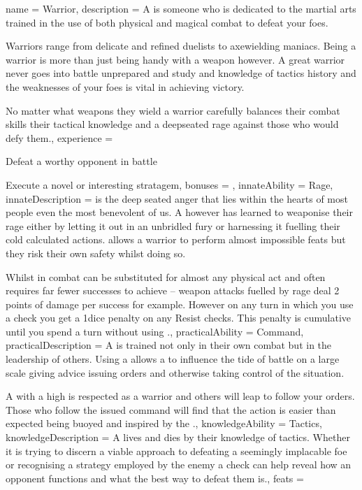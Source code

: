 \archetype
{
	name = Warrior,
	description = A \bname{} is someone who is dedicated to the martial arts\comma{} trained in the use of both physical and magical combat to defeat your foes. 

Warriors range from delicate and refined duelists\comma{} to axe\minus{}wielding maniacs. Being a warrior is more than just being handy with a weapon\comma{} however. A great warrior never goes into battle unprepared\comma{} and study and knowledge of tactics\comma{} history and the weaknesses of your foes is vital in achieving victory. 

No matter what weapons they wield\comma{} a warrior carefully balances their combat skills\comma{} their tactical knowledge and a deep\minus{}seated rage against those who would defy them.,
	experience = \item Defeat a worthy opponent in battle
\item Execute a novel or interesting stratagem,
	bonuses = 
,
	innateAbility = Rage,
	innateDescription =  is the deep seated anger that lies within the hearts of most people\comma{} even the most benevolent of us. A \bname{}\comma{} however\comma{} has learned to weaponise their rage\comma{} either by letting it out in an unbridled fury\comma{} or harnessing it\comma{} fuelling their cold\comma{} calculated actions.  allows a warrior to perform almost impossible feats\comma{} but they risk their own safety whilst doing so.

Whilst in combat\comma{}  can be substituted for almost any physical act\comma{} and often requires far fewer successes to achieve – weapon attacks fuelled by rage deal 2 points of damage per success\comma{} for example. However\comma{} on any turn in which you use a  check\comma{} you get a 1\minus{}dice penalty on any Resist checks. This penalty is cumulative until you spend a turn without using .,
	practicalAbility = Command,
	practicalDescription = A \bname{} is trained not only in their own combat\comma{} but in the leadership of others. Using a  allows a \bname{} to influence the tide of battle on a large scale\comma{} giving advice\comma{} issuing orders and otherwise taking control of the situation. 

A \bname{} with a high  is respected as a warrior\comma{} and others will leap to follow your orders. Those who follow the issued command will find that the action is easier than expected\comma{} being buoyed and inspired by the .,
	knowledgeAbility = Tactics,
	knowledgeDescription = A \bname{} lives and dies by their knowledge of tactics. Whether it is trying to discern a viable approach to defeating a seemingly implacable foe\comma{} or recognising a strategy employed by the enemy\comma{} a  check can help reveal how an opponent functions\comma{} and what the best way to defeat them is.,
	feats = 

}

